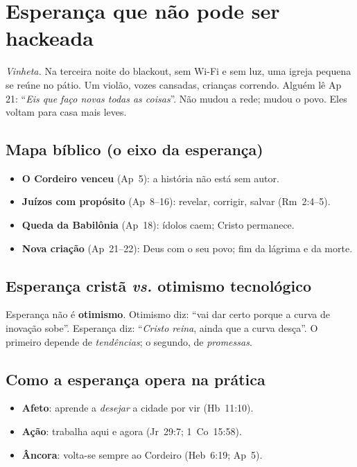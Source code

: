 \chapter{Esperança que não pode ser hackeada}
\noindent\textit{Vinheta.} Na terceira noite do blackout, sem Wi-Fi e sem luz, uma igreja pequena se reúne no pátio. Um violão, vozes cansadas, crianças correndo. Alguém lê Ap 21: ``\emph{Eis que faço novas todas as coisas}''. Não mudou a rede; mudou o povo. Eles voltam para casa mais leves.

\section{Mapa bíblico (o eixo da esperança)}
\begin{itemize}[leftmargin=*,noitemsep]
  \item \textbf{O Cordeiro venceu} (Ap~5): a história não está sem autor.
  \item \textbf{Juízos com propósito} (Ap~8--16): revelar, corrigir, salvar (Rm~2:4--5).
  \item \textbf{Queda da Babilônia} (Ap~18): ídolos caem; Cristo permanece.
  \item \textbf{Nova criação} (Ap~21--22): Deus com o seu povo; fim da lágrima e da morte.
\end{itemize}

\section{Esperança cristã \emph{vs.} otimismo tecnológico}
Esperança não é \textbf{otimismo}. Otimismo diz: ``vai dar certo porque a curva de inovação sobe''. Esperança diz: ``\textit{Cristo reina}, ainda que a curva desça''. O primeiro depende de \emph{tendências}; o segundo, de \emph{promessas}.

\section{Como a esperança opera na prática}
\begin{itemize}[leftmargin=*,noitemsep]
  \item \textbf{Afeto}: aprende a \emph{desejar} a cidade por vir (Hb~11:10).
  \item \textbf{Ação}: trabalha aqui e agora (Jr~29:7; 1~Co~15:58).
  \item \textbf{Âncora}: volta-se sempre ao Cordeiro (Heb~6:19; Ap~5).
\end{itemize}

